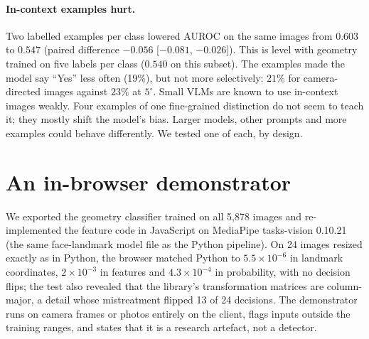 \documentclass[10pt,twocolumn]{article}
\begin{document}
\paragraph{In-context examples hurt.}
Two labelled examples per class lowered AUROC on the same images from $0.603$ to $0.547$ (paired difference
$-0.056$ [$-0.081$, $-0.026$]). This is level with geometry trained on five labels per class ($0.540$ on this subset).
The examples made the model say ``Yes'' less often (19\%), but not more selectively: $21\%$ for camera-directed images
against $23\%$ at $5^\circ$. Small VLMs are known to use in-context images weakly. Four examples of one fine-grained
distinction do not seem to teach it; they mostly shift the model's bias. Larger models, other prompts and more
examples could behave differently. We tested one of each, by design.

\section{An in-browser demonstrator}
We exported the geometry classifier trained on all 5{,}878 images and re-implemented the feature code in JavaScript on
MediaPipe tasks-vision 0.10.21 (the same face-landmark model file as the Python pipeline). On 24 images resized
exactly as in Python, the browser matched Python to $5.5\times10^{-6}$ in landmark coordinates, $2\times10^{-3}$ in
features and $4.3\times10^{-4}$ in probability, with no decision flips; the test also revealed that the library's
transformation matrices are column-major, a detail whose mistreatment flipped 13 of 24 decisions. The demonstrator
runs on camera frames or photos entirely on the client, flags inputs outside the training ranges, and states that it
is a research artefact, not a detector.

\end{document}
